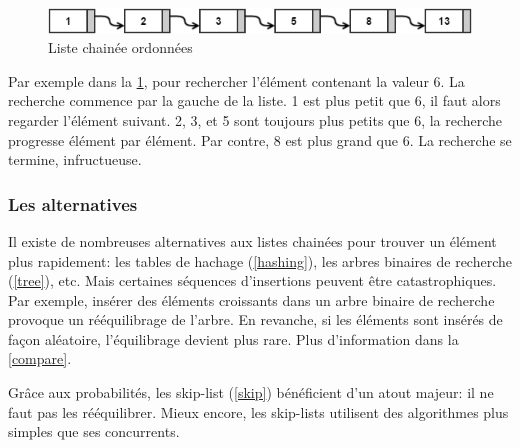 \documentclass[hidelinks,a4paper, 12pt]{article}
\begin{document}
	\begin{figure}[h]
		\includegraphics[width=\textwidth]{img/linkedList}
		\caption{Liste chainée ordonnées}
		\label{LinkedList}
	\end{figure}
	
	Par exemple dans la \cref{LinkedList}, pour rechercher l'élément contenant la valeur 6. La recherche commence par la gauche de la liste. 1 est plus petit que 6, il faut alors regarder l'élément suivant. 2, 3, et 5 sont toujours plus petits que 6, la recherche progresse élément par élément. Par contre, 8 est plus grand que 6. La recherche se termine, infructueuse.
	
	\subsubsection*{Les alternatives}
	Il existe de nombreuses alternatives aux listes chainées pour trouver un élément plus rapidement: les tables de hachage (\cref{hashing}), les arbres binaires de recherche (\cref{tree}), etc. Mais certaines séquences d'insertions peuvent être catastrophiques. Par exemple, insérer des éléments croissants dans un arbre binaire de recherche provoque un rééquilibrage de l'arbre. En revanche, si les éléments sont insérés de façon aléatoire, l'équilibrage devient plus rare. Plus d'information dans la \cref{compare}.

	Grâce aux probabilités, les \og skip-list \fg{} (\cref{skip}) bénéficient d'un atout majeur: il ne faut pas les rééquilibrer. Mieux encore, les skip-lists utilisent des algorithmes plus simples que ses concurrents.
	
\end{document}
